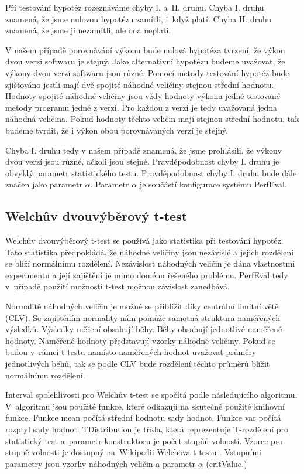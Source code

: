 Při testování hypotéz rozeznáváme
chyby I. a~II. druhu. Chyba I. druhu znamená, že jsme nulovou hypotézu zamítli,
i~když platí. Chyba II. druhu znamená, že jsme ji nezamítli, ale ona neplatí.

V našem případě porovnávání výkonu bude nulová hypotéza tvrzení, že výkon dvou verzí softwaru je stejný.
Jako alternativní hypotézu budeme uvažovat, že výkony dvou verzí softwaru jsou různé.
Pomocí metody testování hypotéz bude zjišťováno jestli mají dvě spojité náhodné veličiny stejnou střední hodnotu.
Hodnoty spojité náhodné veličiny jsou vždy hodnoty výkonu jedné testované metody programu jedné z verzí.
Pro každou z verzí je tedy uvažovaná jedna náhodná veličina.
Pokud hodnoty těchto veličin mají stejnou střední hodnotu, tak budeme tvrdit, že i výkon obou porovnávaných
verzí je stejný.

Chyba I. druhu tedy v našem případě znamená, že jsme prohlásili, že výkony dvou verzí jsou různé,
ačkoli jsou stejné. Pravděpodobnost chyby I. druhu je obvyklý parametr statistického testu.
Pravděpodobnost chyby I. druhu bude dále značen jako parametr $\alpha$. Parametr $\alpha$
je součástí konfigurace systému PerfEval.

\subsection{Welchův dvouvýběrový t-test}

Welchův dvouvýběrový t-test se používá jako statistika při testování hypotéz.
Tato statistika předpokládá, že náhodné veličiny jsou nezávislé a jejich rozdělení
se blíží normálnímu rozdělení. Nezávislost náhodných veličin je dána vlastnostmi
experimentu \cite[]{twosampletests} a její zajištění je mimo doménu řešeného problému. PerfEval
tedy v~případě použití možnosti t-test možnou závislost zanedbává.

Normalitě náhodných veličin je možné se přiblížit díky centrální limitní větě (CLV).
Se zajištěním normality nám pomůže samotná struktura naměřených výsledků. Výsledky měření
obsahují běhy. Běhy obsahují jednotlivé naměřené hodnoty. Naměřené hodnoty představují
vzorky náhodné veličiny. Pokud se budou v~rámci t-testu namísto naměřených hodnot uvažovat
průměry jednotlivých běhů, tak se podle CLV bude rozdělení těchto průměrů blížit normálnímu rozdělení.


Interval spolehlivosti pro Welchův t-test se spočítá podle následujícího algoritmu. V~algoritmu jsou
použité funkce, které odkazují na skutečně použité knihovní funkce. Funkce mean počítá střední hodnotu
sady hodnot. Funkce var počítá rozptyl sady hodnot. TDistribution je třída, která reprezentuje T-rozdělení
pro statistický test a~parametr konstruktoru je počet stupňů volnosti. Vzorec pro stupně volnosti je dostupný na~Wikipedii
Welchova t-testu \cite[]{enwiki:1184251732}. Vstupními parametry jsou vzorky náhodných veličin a parametr $\alpha$ (critValue.)

